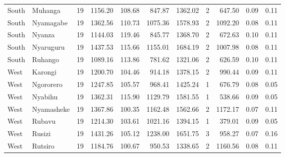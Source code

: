 \begin{tabular}{llrrrrrrrrr}
South & Muhanga & 19 & 1156.20 & 108.68 & 847.87 & 1362.02 & 2 & 647.50 & 0.09 & 0.11 \\
South & Nyamagabe & 19 & 1362.56 & 110.73 & 1075.36 & 1578.93 & 2 & 1092.20 & 0.08 & 0.11 \\
South & Nyanza & 19 & 1144.03 & 119.46 & 845.77 & 1368.70 & 2 & 672.63 & 0.10 & 0.11 \\
South & Nyaruguru & 19 & 1437.53 & 115.66 & 1155.01 & 1684.19 & 2 & 1007.98 & 0.08 & 0.11 \\
South & Ruhango & 19 & 1089.16 & 113.86 & 781.62 & 1321.06 & 2 & 626.59 & 0.10 & 0.11 \\
West & Karongi & 19 & 1200.70 & 104.46 & 914.18 & 1378.15 & 2 & 990.44 & 0.09 & 0.11 \\
West & Ngororero & 19 & 1247.85 & 105.57 & 968.41 & 1425.24 & 1 & 676.79 & 0.08 & 0.05 \\
West & Nyabihu & 19 & 1362.31 & 115.90 & 1129.79 & 1581.55 & 1 & 538.66 & 0.09 & 0.05 \\
West & Nyamasheke & 19 & 1367.86 & 100.35 & 1162.48 & 1562.66 & 2 & 1172.17 & 0.07 & 0.11 \\
West & Rubavu & 19 & 1214.30 & 103.61 & 1021.16 & 1394.15 & 1 & 379.01 & 0.09 & 0.05 \\
West & Rusizi & 19 & 1431.26 & 105.12 & 1238.00 & 1651.75 & 3 & 958.27 & 0.07 & 0.16 \\
West & Rutsiro & 19 & 1184.76 & 100.67 & 950.53 & 1338.65 & 2 & 1160.56 & 0.08 & 0.11 \\
\bottomrule
\end{tabular}
